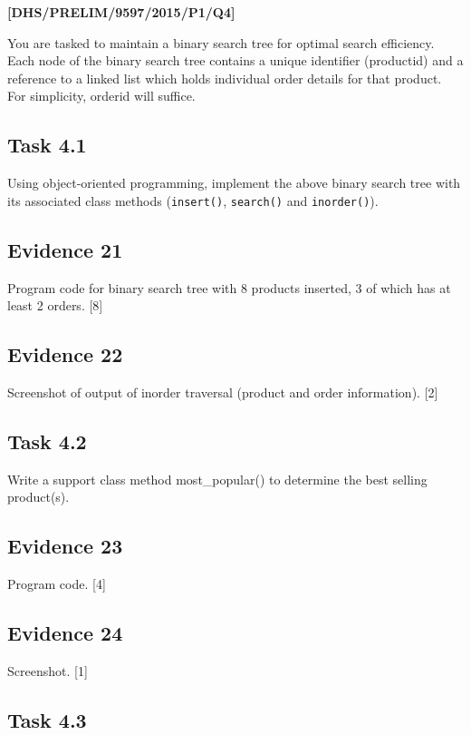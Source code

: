 \item \textbf{{[}DHS/PRELIM/9597/2015/P1/Q4{]} }

You are tasked to maintain a binary search tree for optimal search
efficiency. Each node of the binary search tree contains a unique
identifier (productid) and a reference to a linked list which holds
individual order details for that product. For simplicity, orderid
will suffice. 

\subsection*{Task 4.1 }

Using object-oriented programming, implement the above binary search
tree with its associated class methods (\texttt{insert()}, \texttt{search()}
and \texttt{inorder()}). 

\subsection*{Evidence 21}

Program code for binary search tree with 8 products inserted, 3 of
which has at least 2 orders. \hfill{}{[}8{]}

\subsection*{Evidence 22}

Screenshot of output of inorder traversal (product and order information).
\hfill{} {[}2{]}

\subsection*{Task 4.2 }

Write a support class method most\_popular() to determine the best
selling product(s). 

\subsection*{Evidence 23 }

Program code. \hfill{} {[}4{]}

\subsection*{Evidence 24 }

Screenshot. \hfill{}{[}1{]}

\subsection*{Task 4.3 }

